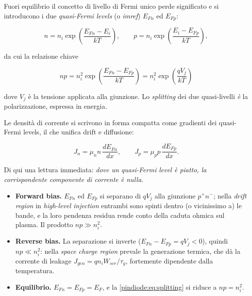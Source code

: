 Fuori equilibrio il concetto di livello di Fermi unico perde significato e si
introducono i due \emph{quasi-Fermi levels} (o \emph{imref}) $E_{Fn}$ ed
$E_{Fp}$:

\begin{equation}
n = n_i \exp\!\left(\frac{E_{Fn} - E_i}{kT}\right),
\qquad
p = n_i \exp\!\left(\frac{E_i - E_{Fp}}{kT}\right),
\end{equation}

da cui la relazione chiave

\begin{equation}
\boxed{\; np = n_i^{2} \exp\!\left(\frac{E_{Fn} - E_{Fp}}{kT}\right)
= n_i^{2} \exp\!\left(\frac{qV_{j}}{kT}\right) \;}
\label{pindiode:eq:splitting}
\end{equation}

dove $V_j$ è la tensione applicata alla giunzione. Lo \emph{splitting} dei due
quasi-livelli \emph{è} la polarizzazione, espressa in energia.

Le densità di corrente si scrivono in forma compatta come gradienti dei
quasi-Fermi levels, il che unifica drift e diffusione:

\begin{equation}
J_n = \mu_n n \, \frac{d E_{Fn}}{dx},
\qquad
J_p = \mu_p p \, \frac{d E_{Fp}}{dx} .
\end{equation}

Di qui una lettura immediata: \emph{dove un quasi-Fermi level è piatto, la
corrispondente componente di corrente è nulla}.

\begin{itemize}
\item \textbf{Forward bias.} $E_{Fn}$ ed $E_{Fp}$ si separano di $qV_j$ alla
giunzione $p^{+}n^{-}$; nella \emph{drift region} in \emph{high-level injection}
entrambi sono spinti dentro (o vicinissimo a) le bande, e la loro pendenza
residua rende conto della caduta ohmica sul plasma. Il prodotto $np \gg n_i^2$.
\item \textbf{Reverse bias.} La separazione si inverte
($E_{Fn} - E_{Fp} = qV_j < 0$), quindi $np \ll n_i^{2}$: nella \emph{space
charge region} prevale la generazione termica, che dà la corrente di leakage
$J_{gen} = q n_i W_{scr} / \tau_g$, fortemente dipendente dalla temperatura.
\item \textbf{Equilibrio.} $E_{Fn} = E_{Fp} = E_F$, e la \eqref{pindiode:eq:splitting} si
riduce a $np = n_i^2$.
\end{itemize}

